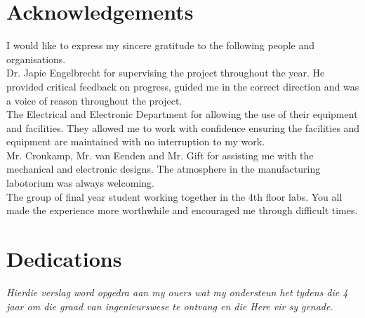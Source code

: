 \begin{abstract}[english]%
In this report a design method for the swinging and balancing  of the underactuated robotic gymnast was researched, simulated and tested on a physical model. The electronic, mechanical and software designs are discussed to show how the physical model was constructed, controllers implemented and data acquired.
\end{abstract}


\begin{abstract}[afrikaans]%
In die projek word die swaaiende en balanseering beheerwette vir 'n robotiese gimnas genavors, ontwerp en getoets op 'n fisiese model. Die eletroniese, meganiese en sagteware ontwerpe word bespreek om ten einde te wys hoe die fisiese model, beheerders en so voort geimplementeer en getoets is.
\end{abstract}


\chapter{Acknowledgements}%

I would like to express my sincere gratitude to the following people
and organisations.\\

Dr. Japie Engelbrecht for supervising the project throughout the year. He provided critical feedback on progress, guided me in the correct direction and was a voice of reason throughout the project.\\

The Electrical and Electronic Department for allowing the use of their equipment and facilities. They allowed me to work with confidence ensuring the facilities and equipment are maintained with no interruption to my work.\\

Mr$.$ Croukamp, Mr$.$ van Eenden and Mr$.$ Gift for assisting me with the mechanical and electronic designs. The atmosphere in the manufacturing labotorium was always welcoming.\\

The group of final year student working together in the 4th floor labs. You all made the experience more worthwhile and encouraged me through  difficult times. 




\chapter{Dedications}%
 \vfill
 \begin{Afr}
 \begin{center}\itshape
    Hierdie verslag word opgedra aan my ouers wat my ondersteun het tydens die 4 jaar om die graad van ingenieurswese te ontvang en die Here vir sy genade. 
 \end{center}
 \end{Afr}
 \vfill
 \clearpage

\endinput
